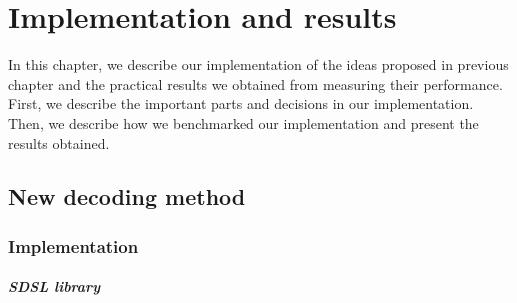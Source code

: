 \chapter{Implementation and results}
\label{kap:kap4}

In this chapter, we describe our implementation of the ideas proposed in previous
chapter and the practical results we obtained from measuring their performance. First,
we describe the important parts and decisions in our implementation. Then, we
describe how we benchmarked our implementation and present the results obtained.

\section{New decoding method}

\subsection{Implementation}

\paragraph{SDSL library}

